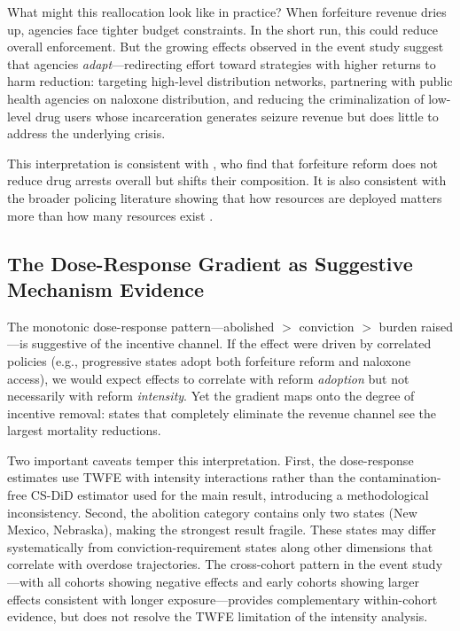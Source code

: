 \documentclass[12pt]{article}
\begin{document}
What might this reallocation look like in practice? When forfeiture revenue dries up, agencies face tighter budget constraints. In the short run, this could reduce overall enforcement. But the growing effects observed in the event study suggest that agencies \emph{adapt}---redirecting effort toward strategies with higher returns to harm reduction: targeting high-level distribution networks, partnering with public health agencies on naloxone distribution, and reducing the criminalization of low-level drug users whose incarceration generates seizure revenue but does little to address the underlying crisis.

This interpretation is consistent with \citet{carpenter2020effects}, who find that forfeiture reform does not reduce drug arrests overall but shifts their composition. It is also consistent with the broader policing literature showing that how resources are deployed matters more than how many resources exist \citep{mello2019more, chalfin2022police}.

\subsection{The Dose-Response Gradient as Suggestive Mechanism Evidence}

The monotonic dose-response pattern---abolished $>$ conviction $>$ burden raised---is suggestive of the incentive channel. If the effect were driven by correlated policies (e.g., progressive states adopt both forfeiture reform and naloxone access), we would expect effects to correlate with reform \emph{adoption} but not necessarily with reform \emph{intensity}. Yet the gradient maps onto the degree of incentive removal: states that completely eliminate the revenue channel see the largest mortality reductions.

Two important caveats temper this interpretation. First, the dose-response estimates use TWFE with intensity interactions rather than the contamination-free CS-DiD estimator used for the main result, introducing a methodological inconsistency. Second, the abolition category contains only two states (New Mexico, Nebraska), making the strongest result fragile. These states may differ systematically from conviction-requirement states along other dimensions that correlate with overdose trajectories. The cross-cohort pattern in the event study---with all cohorts showing negative effects and early cohorts showing larger effects consistent with longer exposure---provides complementary within-cohort evidence, but does not resolve the TWFE limitation of the intensity analysis.
\end{document}
